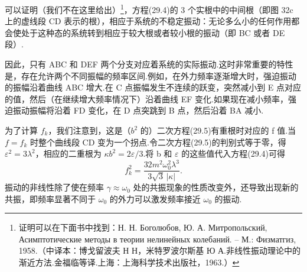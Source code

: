 可以证明（我们不在这里给出）\footnote{证明可以在下面书中找到：Н. Н. Боголюбов, Ю. А. Митропольский, Асимптотические методы в теории нелинейных колебаний. – М.: Физматгиз, 1958.（中译本：博戈留波夫 Н Н，米特罗波尔斯基 Ю А.非线性振动理论中的渐近方法.金福临等译.上海：上海科学技术出版社，1963.）}，方程(29.4)的 3 个实根中的中间根（即图 32c 上的虚线段 CD 表示的根），相应于系统的不稳定振动：无论多么小的任何作用都会使处于这种态的系统转到相应于较大根或者较小根的振动（即 BC 或者 DE 段）.

因此，只有 ABC 和 DEF 两个分支对应着系统的实际振动.这时非常重要的特性是，存在允许两个不同振幅的频率区间.例如，在外力频率逐渐增大时，强迫振动的振幅沿着曲线 ABC 增大.在 C 点振幅发生不连续的跃变，突然减小到 E 点对应的值，然后（在继续增大频率情况下）沿着曲线 EF 变化.如果现在减小频率，强迫振动振幅将沿着 FD 变化，在 D 点突跳到 B 点，然后沿着 BA 减小.

为了计算 $f_k$，我们注意到，这是（$b^2$ 的）二次方程(29.5)有重根时对应的 f 值.当 $f=f_k$ 时整个曲线段 CD 变为一个拐点.令二次方程(29.5)的判别式等于零，得 $\varepsilon^2=3\lambda^2$，相应的二重根为 $\kappa b^2=2\varepsilon/3$.将 b 和 $\varepsilon$ 的这些值代入方程(29.4)可得
\begin{equation}
  f_k^2=\frac{32m^2\omega_0^2\lambda^3}{3\sqrt{3}\,|\kappa|}.
\end{equation}
振动的非线性除了使在频率 $\gamma\approx\omega_0$ 处的共振现象的性质改变外，还导致出现新的共振，即频率显著不同于 $\omega_0$ 的外力可以激发频率接近 $\omega_0$ 的振动.

